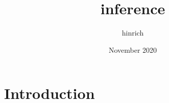 \documentclass{article}
\title{inference}
\author{hinrich }
\date{November 2020}
\begin{document}
\maketitle

\section{Introduction}
\end{document}
